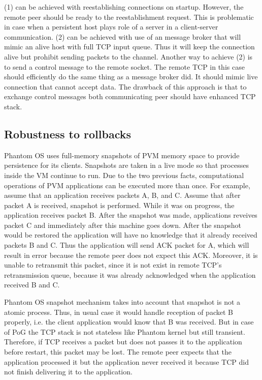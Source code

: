 (1) can be achieved with reestablishing connections on startup. However, the
remote peer should be ready to the reestablishment request. This is problematic
in case when a persistent host plays role of a server in a client-server
communication. (2) can be achieved with use of an message broker that will
mimic an alive host with full TCP input queue. Thus it will keep the connection
alive but prohibit sending packets to the channel. Another way to achieve (2)
is to send a control message to the remote socket. The remote TCP in this case
should efficiently do the same thing as a message broker did. It should mimic
live connection that cannot accept data. The drawback of this approach is that
to exchange control messages both communicating peer should have enhanced TCP
stack.

\subsection {Robustness to rollbacks}

Phantom OS uses full-memory snapshots of PVM memory space to provide
persistence for its clients. Snapshots are taken in a live mode so that
processes inside the VM continue to run. Due to the two previous facts,
computational operations of PVM applications can be executed more than once.
For example, assume that an application receives packets A, B, and C.  Assume
that after packet A is received, snapshot is performed. While it was on
progress, the application receives packet B. After the snapshot was made,
applications reveives packet C and immediately after this machine goes down.
After the snapshot would be restored the application will have no knowledge
that it already received packets B and C. Thus the application will send ACK
packet for A, which will result in error because the remote peer does not
expect this ACK. Moreover, it is unable to retransmit this packet, since it is
not exist in remote TCP's retransmission queue, because it was already
acknowledged when the application received B and C.

Phantom OS snapshot mechanism takes into account that snapshot is not a atomic
process. Thus, in usual case it would handle reception of packet B properly,
i.e. the client application would know that B was received. But in case of 
PoG the TCP stack is not stateless like Phantom kernel but still transient.
Therefore, if TCP receives a packet but does not passes it to the application
before restart, this packet may be lost. The remote peer expects that the
application processed it but the application never received it because TCP did
not finish delivering it to the application.


